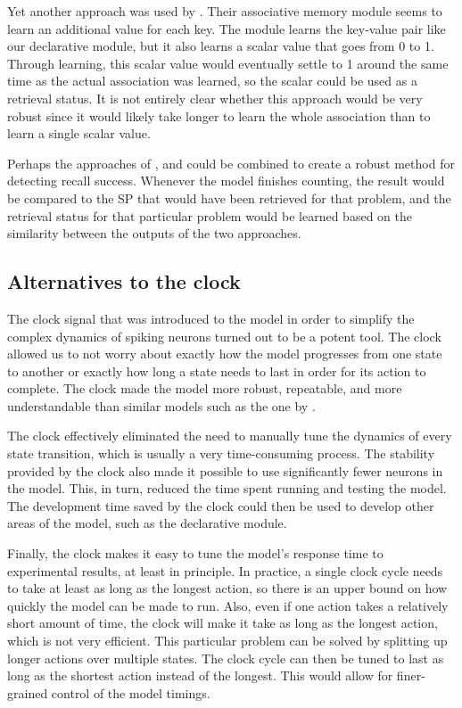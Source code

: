\documentclass[10pt, a4paper, twocolumn]{article}
\begin{document}
Yet another approach was used by \cite{Voelker2014}. Their associative memory module seems to learn an additional value for each key. The module learns the key-value pair like our declarative module, but it also learns a scalar value that goes from 0 to 1. Through learning, this scalar value would eventually settle to 1 around the same time as the actual association was learned, so the scalar could be used as a retrieval status. It is not entirely clear whether this approach would be very robust since it would likely take longer to learn the whole association than to learn a single scalar value.

Perhaps the approaches of \cite{Aubin2016}, and \cite{Voelker2014} could be combined to create a robust method for detecting recall success. Whenever the model finishes counting, the result would be compared to the SP that would have been retrieved for that problem, and the retrieval status for that particular problem would be learned based on the similarity between the outputs of the two approaches.

\subsection{Alternatives to the clock}

The clock signal that was introduced to the model in order to simplify the complex dynamics of spiking neurons turned out to be a potent tool. The clock allowed us to not worry about exactly how the model progresses from one state to another or exactly how long a state needs to last in order for its action to complete. The clock made the model more robust, repeatable, and more understandable than similar models such as the one by \cite{Aubin2016}. 

The clock effectively eliminated the need to manually tune the dynamics of every state transition, which is usually a very time-consuming process. The stability provided by the clock also made it possible to use significantly fewer neurons in the model. This, in turn, reduced the time spent running and testing the model. The development time saved by the clock could then be used to develop other areas of the model, such as the declarative module.

Finally, the clock makes it easy to tune the model's response time to experimental results, at least in principle. In practice, a single clock cycle needs to take at least as long as the longest action, so there is an upper bound on how quickly the model can be made to run. Also, even if one action takes a relatively short amount of time, the clock will make it take as long as the longest action, which is not very efficient. This particular problem can be solved by splitting up longer actions over multiple states. The clock cycle can then be tuned to last as long as the shortest action instead of the longest. This would allow for finer-grained control of the model timings.
\end{document}
